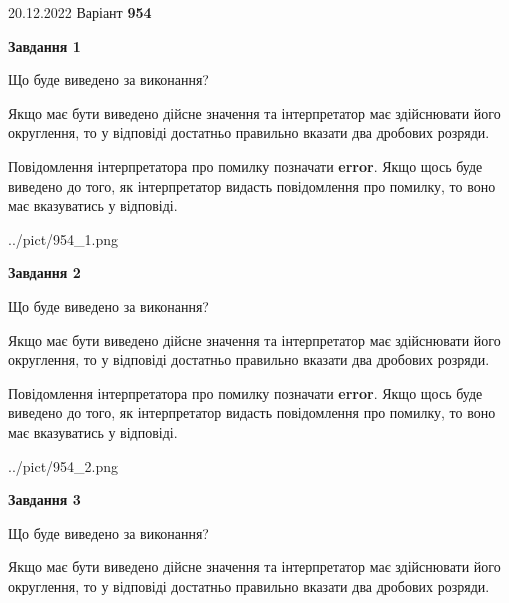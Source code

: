 \documentclass[12pt, ukrainian]{article}
\begin{document}
{20.12.2022 Варіант \No \textbf { 954 }\par}
{
\begin {Large}

{\begin {center}\textbf{Завдання 1}\end {center}}\par
Що буде виведено за виконання? \par

Якщо має бути виведено дійсне значення та інтерпретатор має здійснювати його округлення, 
то у відповіді достатньо правильно вказати два дробових розряди.

Повідомлення інтерпретатора про помилку позначати \textbf{error}.
Якщо щось буде виведено до того, як інтерпретатор видасть повідомлення про помилку, 
то воно має вказуватись у відповіді. \par

\begin{center}
	{../pict/954_1.png}
\end{center}
\newpage

{\begin {center}\textbf{Завдання 2}\end {center}}\par
Що буде виведено за виконання? \par

Якщо має бути виведено дійсне значення та інтерпретатор має здійснювати його округлення, 
то у відповіді достатньо правильно вказати два дробових розряди.

Повідомлення інтерпретатора про помилку позначати \textbf{error}.
Якщо щось буде виведено до того, як інтерпретатор видасть повідомлення про помилку, 
то воно має вказуватись у відповіді. \par

\begin{center}
	{../pict/954_2.png}
\end{center}
\newpage

{\begin {center}\textbf{Завдання 3}\end {center}}\par
Що буде виведено за виконання? \par

Якщо має бути виведено дійсне значення та інтерпретатор має здійснювати його округлення, 
то у відповіді достатньо правильно вказати два дробових розряди.


\end{Large}}
\end{document}

